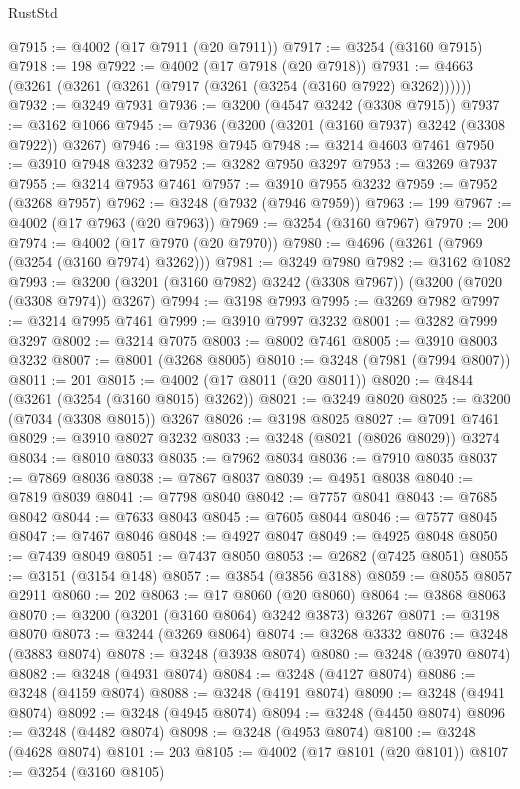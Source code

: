 \begin{lexlean}{RustStd}
\begin{coremodule}
{\begin{coremodule}
{{{{{{{{{{{{{{{{{{{{{{{{{@7915 := @4002 (@17 @7911 (@20 @7911))
@7917 := @3254 (@3160 @7915)
@7918 := 198
@7922 := @4002 (@17 @7918 (@20 @7918))
@7931 := @4663 (@3261 (@3261 (@3261 (@7917 (@3261 (@3254 (@3160 @7922) @3262))))))
@7932 := @3249 @7931
@7936 := @3200 (@4547 @3242 (@3308 @7915))
@7937 := @3162 @1066
@7945 := @7936 (@3200 (@3201 (@3160 @7937) @3242 (@3308 @7922)) @3267)
@7946 := @3198 @7945
@7948 := @3214 @4603 @7461
@7950 := @3910 @7948 @3232
@7952 := @3282 @7950 @3297
@7953 := @3269 @7937
@7955 := @3214 @7953 @7461
@7957 := @3910 @7955 @3232
@7959 := @7952 (@3268 @7957)
@7962 := @3248 (@7932 (@7946 @7959))
@7963 := 199
@7967 := @4002 (@17 @7963 (@20 @7963))
@7969 := @3254 (@3160 @7967)
@7970 := 200
@7974 := @4002 (@17 @7970 (@20 @7970))
@7980 := @4696 (@3261 (@7969 (@3254 (@3160 @7974) @3262)))
@7981 := @3249 @7980
@7982 := @3162 @1082
@7993 := @3200 (@3201 (@3160 @7982) @3242 (@3308 @7967)) (@3200 (@7020 (@3308 @7974)) @3267)
@7994 := @3198 @7993
@7995 := @3269 @7982
@7997 := @3214 @7995 @7461
@7999 := @3910 @7997 @3232
@8001 := @3282 @7999 @3297
@8002 := @3214 @7075
@8003 := @8002 @7461
@8005 := @3910 @8003 @3232
@8007 := @8001 (@3268 @8005)
@8010 := @3248 (@7981 (@7994 @8007))
@8011 := 201
@8015 := @4002 (@17 @8011 (@20 @8011))
@8020 := @4844 (@3261 (@3254 (@3160 @8015) @3262))
@8021 := @3249 @8020
@8025 := @3200 (@7034 (@3308 @8015)) @3267
@8026 := @3198 @8025
@8027 := @7091 @7461
@8029 := @3910 @8027 @3232
@8033 := @3248 (@8021 (@8026 @8029)) @3274
@8034 := @8010 @8033
@8035 := @7962 @8034
@8036 := @7910 @8035
@8037 := @7869 @8036
@8038 := @7867 @8037
@8039 := @4951 @8038
@8040 := @7819 @8039
@8041 := @7798 @8040
@8042 := @7757 @8041
@8043 := @7685 @8042
@8044 := @7633 @8043
@8045 := @7605 @8044
@8046 := @7577 @8045
@8047 := @7467 @8046
@8048 := @4927 @8047
@8049 := @4925 @8048
@8050 := @7439 @8049
@8051 := @7437 @8050
@8053 := @2682 (@7425 @8051)
@8055 := @3151 (@3154 @148)
@8057 := @3854 (@3856 @3188)
@8059 := @8055 @8057 @2911
@8060 := 202
@8063 := @17 @8060 (@20 @8060)
@8064 := @3868 @8063
@8070 := @3200 (@3201 (@3160 @8064) @3242 @3873) @3267
@8071 := @3198 @8070
@8073 := @3244 (@3269 @8064)
@8074 := @3268 @3332
@8076 := @3248 (@3883 @8074)
@8078 := @3248 (@3938 @8074)
@8080 := @3248 (@3970 @8074)
@8082 := @3248 (@4931 @8074)
@8084 := @3248 (@4127 @8074)
@8086 := @3248 (@4159 @8074)
@8088 := @3248 (@4191 @8074)
@8090 := @3248 (@4941 @8074)
@8092 := @3248 (@4945 @8074)
@8094 := @3248 (@4450 @8074)
@8096 := @3248 (@4482 @8074)
@8098 := @3248 (@4953 @8074)
@8100 := @3248 (@4628 @8074)
@8101 := 203
@8105 := @4002 (@17 @8101 (@20 @8101))
@8107 := @3254 (@3160 @8105)
}}}}}}}}}}}}}}}}}}}}}}}}}
\end{coremodule}}
\end{coremodule}
\end{lexlean}
